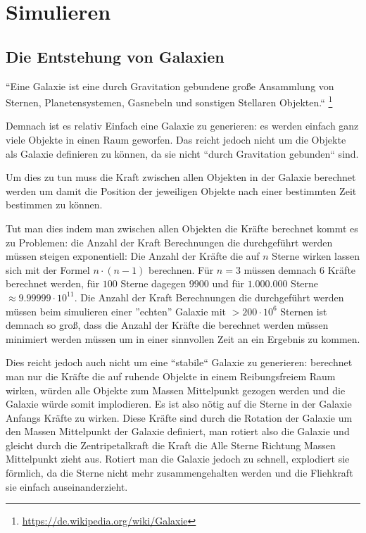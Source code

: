\section{Simulieren}

\subsection{Die Entstehung von Galaxien}
\par ``Eine Galaxie ist eine durch Gravitation gebundene große Ansammlung von
Sternen, Planetensystemen, Gasnebeln und sonstigen Stellaren Objekten.``
\footnote{\url{https://de.wikipedia.org/wiki/Galaxie}}

\par Demnach ist es relativ Einfach eine Galaxie zu generieren: es werden einfach
ganz viele Objekte in einen Raum geworfen. Das reicht jedoch nicht um die
Objekte als Galaxie definieren zu können, da sie nicht ``durch Gravitation
gebunden`` sind.

\par Um dies zu tun muss die Kraft zwischen allen Objekten in der Galaxie berechnet
werden um damit die Position der jeweiligen Objekte nach einer bestimmten Zeit
bestimmen zu können.

\par Tut man dies indem man zwischen allen Objekten die Kräfte berechnet kommt
es zu Problemen: die Anzahl der Kraft Berechnungen die durchgeführt werden
müssen steigen exponentiell: Die Anzahl der Kräfte die auf \(n\) Sterne wirken
lassen sich mit der Formel \( n \cdot (n-1) \) berechnen. Für \( n=3 \) müssen
demnach \( 6 \) Kräfte berechnet werden, für \( 100 \) Sterne dagegen \( 9900
\) und für \( 1.000.000 \) Sterne \( \approx 9.99999 \cdot 10^{11} \). Die
Anzahl der Kraft Berechnungen die durchgeführt werden müssen beim simulieren
einer ''echten'' Galaxie mit \( >200 \cdot 10^6 \) Sternen ist demnach so groß,
dass die Anzahl der Kräfte die berechnet werden müssen minimiert werden müssen
um in einer sinnvollen Zeit an ein Ergebnis zu kommen.

\par Dies reicht jedoch auch nicht um eine ``stabile`` Galaxie zu generieren:
berechnet man nur die Kräfte die auf ruhende Objekte in einem Reibungsfreiem Raum
wirken, würden alle Objekte zum Massen Mittelpunkt gezogen werden und die Galaxie
würde somit implodieren. Es ist also nötig auf die Sterne in der Galaxie
Anfangs Kräfte zu wirken. Diese Kräfte sind durch die Rotation der Galaxie um
den Massen Mittelpunkt der Galaxie definiert, man rotiert also die Galaxie und
gleicht durch die Zentripetalkraft die Kraft die Alle Sterne Richtung
Massen Mittelpunkt zieht aus. Rotiert man die Galaxie jedoch zu schnell,
explodiert sie förmlich, da die Sterne nicht mehr zusammengehalten werden und
die Fliehkraft sie einfach auseinanderzieht.

